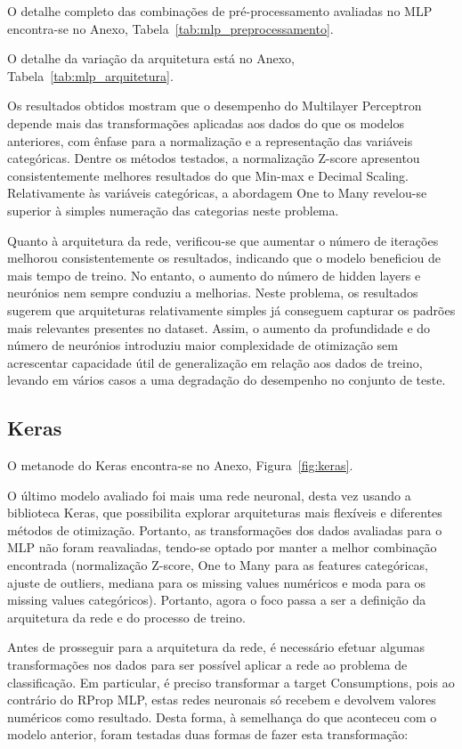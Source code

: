 \documentclass[11pt,a4paper]{article}
\newcommand{\code}[1]{{\ttfamily\hyphenchar\font=45\relax #1}}
\begin{document}
O detalhe completo das combinações de pré-processamento avaliadas no MLP encontra-se no Anexo, Tabela~\ref{tab:mlp_preprocessamento}.

O detalhe da variação da arquitetura está no Anexo, Tabela~\ref{tab:mlp_arquitetura}.

Os resultados obtidos mostram que o desempenho do Multilayer Perceptron depende mais das transformações aplicadas aos dados do que os modelos anteriores, com ênfase para a normalização e a representação das variáveis categóricas. Dentre os métodos testados, a normalização Z-score apresentou consistentemente melhores resultados do que Min-max e Decimal Scaling. Relativamente às variáveis categóricas, a abordagem One to Many revelou-se superior à simples numeração das categorias neste problema.

Quanto à arquitetura da rede, verificou-se que aumentar o número de iterações melhorou consistentemente os resultados, indicando que o modelo beneficiou de mais tempo de treino. No entanto, o aumento do número de hidden layers e neurónios nem sempre conduziu a melhorias. Neste problema, os resultados sugerem que arquiteturas relativamente simples já conseguem capturar os padrões mais relevantes presentes no dataset. Assim, o aumento da profundidade e do número de neurónios introduziu maior complexidade de otimização sem acrescentar capacidade útil de generalização em relação aos dados de treino, levando em vários casos a uma degradação do desempenho no conjunto de teste.

\subsection{Keras}

O metanode do Keras encontra-se no Anexo, Figura~\ref{fig:keras}.

O último modelo avaliado foi mais uma rede neuronal, desta vez usando a biblioteca Keras, que possibilita explorar arquiteturas mais flexíveis e diferentes métodos de otimização. Portanto, as transformações dos dados avaliadas para o MLP não foram reavaliadas, tendo-se optado por manter a melhor combinação encontrada (normalização Z-score, One to Many para as features categóricas, ajuste de outliers, mediana para os missing values numéricos e moda para os missing values categóricos). Portanto, agora o foco passa a ser a definição da arquitetura da rede e do processo de treino.

Antes de prosseguir para a arquitetura da rede, é necessário efetuar algumas transformações nos dados para ser possível aplicar a rede ao problema de classificação. Em particular, é preciso transformar a target \code{Consumptions}, pois ao contrário do RProp MLP, estas redes neuronais só recebem e devolvem valores numéricos como resultado. Desta forma, à semelhança do que aconteceu com o modelo anterior, foram testadas duas formas de fazer esta transformação:
\end{document}
